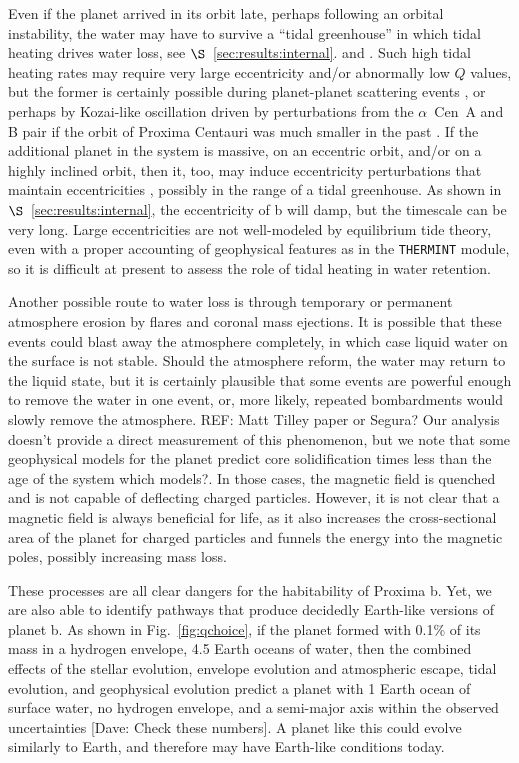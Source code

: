 \documentclass[preprint,12pt]{aastex}
\newcommand{\xxx}[1]{{\color{red} #1}} %
\def\acen{{$\alpha$~Cen}}
\def\thermint{\texttt{\footnotesize{THERMINT}}\xspace}
\begin{document}
Even if the planet arrived in its orbit late, perhaps following an
orbital instability, the water may have to survive a ``tidal
greenhouse'' in which tidal heating drives water loss, see
$\S$~\ref{sec:results:internal}. and \citep{Barnes13}. Such high tidal heating
rates may require very large eccentricity and/or abnormally low $Q$
values, but the former is certainly possible during planet-planet
scattering events \citep{Chatterjee08}, or perhaps by Kozai-like
oscillation driven by perturbations from the \acen~A and B pair if the
orbit of Proxima Centauri was much smaller in the past
\citep{DesideraBarbieri07}. If the additional planet in the system is
massive, on an eccentric orbit, and/or on a highly inclined orbit,
then it, too, may induce eccentricity perturbations that maintain
eccentricities \citep{TakedaRasio05}, possibly in the range of a tidal
greenhouse. As shown in $\S$~\ref{sec:results:internal}, the eccentricity of
b will damp, but the timescale can be very long. Large eccentricities
are not well-modeled by equilibrium tide theory, even with a proper
accounting of geophysical features as in the \thermint module, so it
is difficult at present to assess the role of tidal heating in water
retention.

Another possible route to water loss is through temporary or permanent
atmosphere erosion by flares and coronal mass ejections. It is
possible that these events could blast away the atmosphere completely,
in which case liquid water on the surface is not stable. Should the
atmosphere reform, the water may return to the liquid state, but it is
certainly plausible that some events are powerful enough to remove the
water in one event, or, more likely, repeated bombardments would
slowly remove the \xxx{atmosphere}. \xxx{REF: Matt Tilley paper or Segura?} Our analysis doesn't provide a direct
measurement of this phenomenon, but we note that some geophysical
models for the planet predict core solidification times less than the
age of the system \xxx{which models?}. In those cases, the magnetic field is quenched and
is not capable of deflecting charged particles. However, it is not
clear that a magnetic field is always beneficial for life, as it also
increases the cross-sectional area of the planet for charged particles
and funnels the energy into the magnetic poles, possibly increasing
mass loss.

These processes are all clear dangers for the habitability of Proxima
b. Yet, we are also able to identify pathways that produce decidedly
Earth-like versions of planet b. \xxx{As shown in Fig.~\ref{fig:qchoice},
if the planet formed with 0.1\% of its mass in a hydrogen envelope, 4.5
Earth oceans of water, then the combined effects of the stellar
evolution, envelope evolution and atmospheric escape, tidal evolution,
and geophysical evolution predict a planet with 1 Earth ocean of
surface water, no hydrogen envelope, and a semi-major axis within the
observed uncertainties [Dave: Check these numbers]}. A planet like this could evolve similarly to
Earth, and therefore may have Earth-like conditions today.
\end{document}
